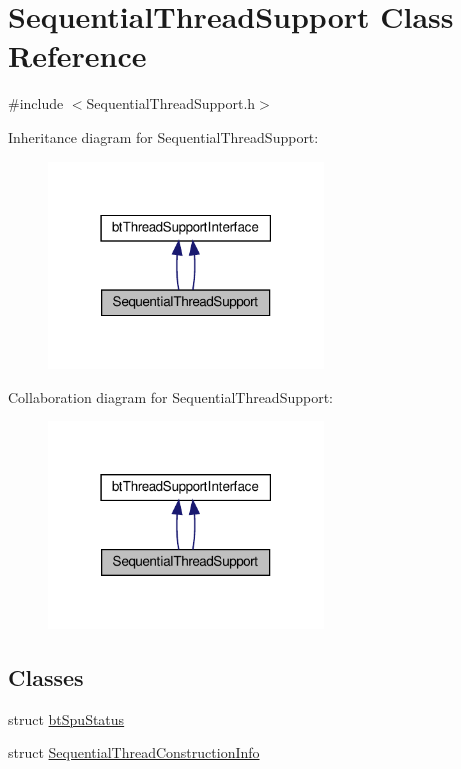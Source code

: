 \hypertarget{classSequentialThreadSupport}{}\section{Sequential\+Thread\+Support Class Reference}
\label{classSequentialThreadSupport}


{\ttfamily \#include $<$Sequential\+Thread\+Support.\+h$>$}



Inheritance diagram for Sequential\+Thread\+Support\+:
\nopagebreak
\begin{figure}[H]
\begin{center}
\leavevmode
\includegraphics[width=207pt]{classSequentialThreadSupport__inherit__graph}
\end{center}
\end{figure}


Collaboration diagram for Sequential\+Thread\+Support\+:
\nopagebreak
\begin{figure}[H]
\begin{center}
\leavevmode
\includegraphics[width=207pt]{classSequentialThreadSupport__coll__graph}
\end{center}
\end{figure}
\subsection*{Classes}
\begin{DoxyCompactItemize}
\item 
struct \hyperlink{structSequentialThreadSupport_1_1btSpuStatus}{bt\+Spu\+Status}
\item 
struct \hyperlink{structSequentialThreadSupport_1_1SequentialThreadConstructionInfo}{Sequential\+Thread\+Construction\+Info}
\end{DoxyCompactItemize}
